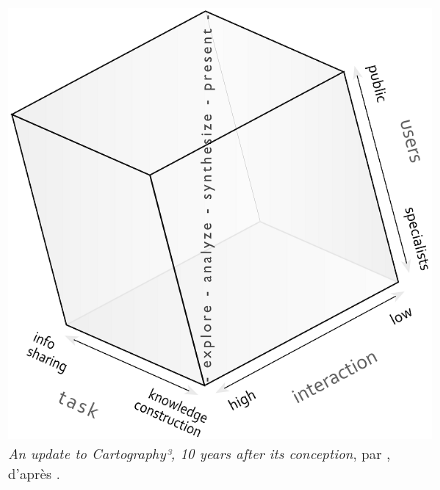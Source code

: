 
\begin{figure}[H]
	\centering
	\vspace{0pt}
	\includegraphics[width=.7\linewidth]{img/cartography3.png}
	\captionsetup{width=.7\linewidth}
	\caption[\og \textit{An update to Cartography³, 10 years after its conception}\fg{}.]{\og \textit{An update to Cartography³, 10 years after its conception}\fg{}, par \textcite{coltekin_geovisualization_2018}, d'après \textcite[10]{maceachren_geovisualization_2004}.}
	\label{fig:cartography3}
\end{figure}

